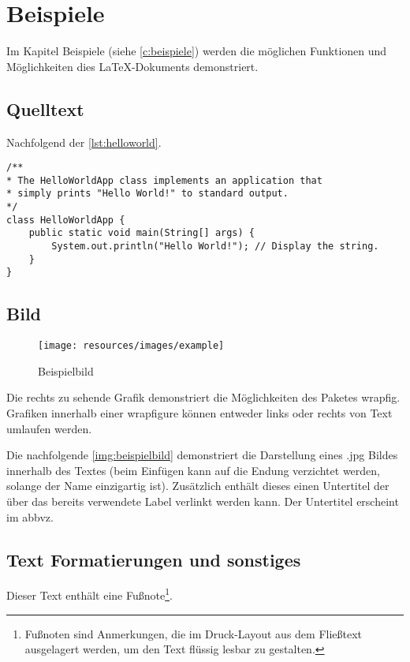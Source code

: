 \chapter{Beispiele} \label{c:beispiele}

Im Kapitel Beispiele (siehe \autoref{c:beispiele}) werden die möglichen Funktionen und Möglichkeiten dies LaTeX-Dokuments demonstriert.

\section{Quelltext}

Nachfolgend der \autoref{lst:helloworld}.

\begin{lstlisting}[caption={Hello World}, captionpos=b, label={lst:helloworld}]
/**
* The HelloWorldApp class implements an application that
* simply prints "Hello World!" to standard output.
*/
class HelloWorldApp {
	public static void main(String[] args) {
		System.out.println("Hello World!"); // Display the string.
	}
}
\end{lstlisting}

\section{Bild}

\begin{wrapfigure}{R}{0.5\textwidth}
	\centering
	\texttt{[image: resources/images/example]}
	\caption{Beispielbild {\cite{PEXELS2015}}}
\end{wrapfigure}

Die rechts zu sehende Grafik demonstriert die Möglichkeiten des Paketes \glqq wrapfig\grqq . Grafiken innerhalb einer \glqq wrapfigure\grqq{} können entweder links oder rechts von Text umlaufen werden.

Die nachfolgende \autoref{img:beispielbild} demonstriert die Darstellung eines \glqq *.jpg\grqq{} Bildes innerhalb des Textes (beim Einfügen kann auf die Endung verzichtet werden, solange der Name einzigartig ist). Zusätzlich enthält dieses einen Untertitel der über das bereits verwendete Label verlinkt werden kann. Der Untertitel erscheint im \gls{abbvz}.

\section{Text Formatierungen und sonstiges}
Dieser Text enthält eine Fußnote\footnote{Fußnoten sind Anmerkungen, die im Druck-Layout aus dem Fließtext ausgelagert werden, um den Text flüssig lesbar zu gestalten.}.


